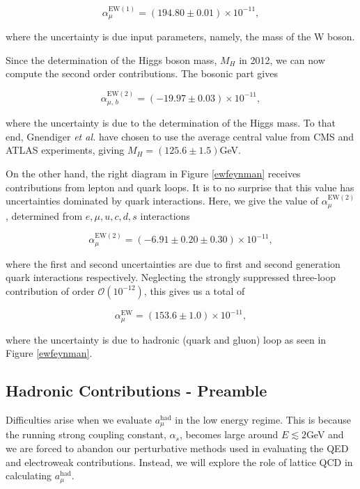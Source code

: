 \documentclass{article}
\numberwithin{equation}{section} %
\begin{document}
\begin{equation}
\alpha_\mu^\mathrm{EW(1)} = (194.80\pm 0.01)\times 10^{-11},
\label{ew1val}
\end{equation}

\noindent where the uncertainty is due input parameters, namely, the mass of the W boson. 

Since the determination of the Higgs boson mass, $M_H$ in 2012, we can now compute the second order contributions. The bosonic part gives

\begin{equation}
\alpha_{\mu, \, b}^\mathrm{EW(2)} = (-19.97 \pm 0.03)\times 10^{-11},
\end{equation}

\noindent where the uncertainty is due to the determination of the Higgs mass. To that end,  Gnendiger \textit{et al.} have chosen to use the average central value from CMS and ATLAS experiments, giving $M_H =(125.6\pm 1.5)$GeV.

On the other hand, the right diagram in Figure \ref{ewfeynman} receives contributions from lepton and quark loops. It is to no surprise that this value has uncertainties dominated by quark interactions. Here, we give the value of $\alpha_\mu^\mathrm{EW(2)}$, determined from $e, \mu, u, c , d , s$ interactions

\begin{equation}
\alpha_\mu^\mathrm{EW(2)} = (-6.91\pm 0.20\pm 0.30)\times 10^{-11},
\end{equation}

\noindent where the first and second uncertainties are due to first and second generation quark interactions respectively. Neglecting the strongly suppressed three-loop contribution of order $\mathcal{O}(10^{-12})$\cite{hoecker}, this gives us a total of

\begin{equation}
\alpha_\mu^\mathrm{EW} = (153.6\pm 1.0)\times 10^{-11},
\end{equation}

\noindent where the uncertainty is due to hadronic (quark and gluon) loop as seen in Figure \ref{ewfeynman}\cite{hoecker}.


\subsection{Hadronic Contributions - Preamble}

Difficulties arise when we evaluate $a_\mu^\mathrm{had}$ in the low energy regime. This is because the running strong coupling constant, $\alpha_s$, becomes large around $E\lesssim2$GeV\cite{lehnerg2} and we are forced to abandon our perturbative methods used in evaluating the QED and electroweak contributions. Instead, we will explore the role of lattice QCD in calculating $a_\mu^\mathrm{had}$. 
\end{document}
